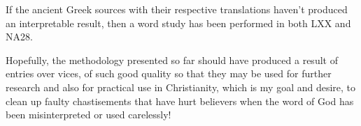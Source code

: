 If the ancient Greek sources with their respective translations haven't produced
an interpretable result, then a word study has been performed in both LXX and NA28.

Hopefully, the methodology presented so far should have produced a result of 
entries over vices, of such good quality so that they may be used for further research
and also for practical use in Christianity, which is my goal and desire, to clean
up faulty chastisements that have hurt believers when the word of God has been
misinterpreted or used carelessly!
